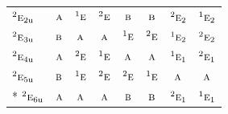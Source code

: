\documentclass[10pt,a4paper]{article}
\numberwithin{equation}{section}
\newcommand{\irr}[1]{\text{\normalfont\scshape #1}}
\newcommand{\conjpair}[1]{{}^{#1}}
\newcommand{\ptag}[1]{\mathrm{#1}}
\begin{document}
{\begin{longtable}{@{}lccccccc@{}}
$\conjpair{2}\irr{e}_{2\ptag{u}}$ & $\irr{a}$ & $\conjpair{1}\irr{e}$ & $\conjpair{2}\irr{e}$ & $\irr{b}$ & $\irr{b}$ & $\conjpair{2}\irr{e}_{2}$ & $\conjpair{1}\irr{e}_{2}$\\
$\conjpair{2}\irr{e}_{3\ptag{u}}$ & $\irr{b}$ & $\irr{a}$ & $\irr{a}$ & $\conjpair{1}\irr{e}$ & $\conjpair{2}\irr{e}$ & $\conjpair{1}\irr{e}_{2}$ & $\conjpair{2}\irr{e}_{2}$\\
$\conjpair{2}\irr{e}_{4\ptag{u}}$ & $\irr{a}$ & $\conjpair{2}\irr{e}$ & $\conjpair{1}\irr{e}$ & $\irr{a}$ & $\irr{a}$ & $\conjpair{1}\irr{e}_{1}$ & $\conjpair{2}\irr{e}_{1}$\\
$\conjpair{2}\irr{e}_{5\ptag{u}}$ & $\irr{b}$ & $\conjpair{1}\irr{e}$ & $\conjpair{2}\irr{e}$ & $\conjpair{2}\irr{e}$ & $\conjpair{1}\irr{e}$ & $\irr{a}$ & $\irr{a}$\\*
$\conjpair{2}\irr{e}_{6\ptag{u}}$ & $\irr{a}$ & $\irr{a}$ & $\irr{a}$ & $\irr{b}$ & $\irr{b}$ & $\conjpair{2}\irr{e}_{1}$ & $\conjpair{1}\irr{e}_{1}$\\
\bottomrule\end{longtable}}
\end{document}
